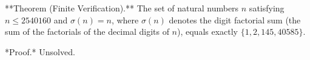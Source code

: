 
**Theorem (Finite Verification).** The set of natural numbers $n$ satisfying $n \leq 2540160$ and $\sigma(n) = n$, where $\sigma(n)$ denotes the digit factorial sum (the sum of the factorials of the decimal digits of $n$), equals exactly $\{1, 2, 145, 40585\}$.

*Proof.* Unsolved.
